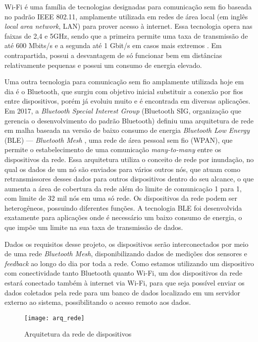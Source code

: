 \documentclass[monografia.tex]{subfiles}
\begin{document}
Wi-Fi é uma família de tecnologias designadas para comunicação sem fio baseada no padrão IEEE 802.11, amplamente utilizada em redes de área local (em inglês \textit{local area network}, LAN) para prover acesso à internet. Essa tecnologia opera nas faixas de 2,4 e 5GHz, sendo que a primeira permite uma taxa de transmissão de até 600 Mbits/s e a segunda até 1 Gbit/s em casos mais extremos \cite{Wi-Fi-datarate}. Em contrapartida, possui a desvantagem de só funcionar bem em distâncias relativamente pequenas e possui um consumo de energia elevado.

Uma outra tecnologia para comunicação sem fio amplamente utilizada hoje em dia é o Bluetooth, que surgiu com objetivo inicial substituir a conexão por fios entre dispositivos, porém já evoluiu muito e é encontrada em diversas aplicações. Em 2017, a \textit{Bluetooth Special Interest Group} (Bluetooth SIG, organização que gerencia o desenvolvimento do padrão Bluetooth) definiu uma arquitetura de rede em malha baseada na versão de baixo consumo de energia \textit{Bluetooth Low Energy} (BLE) --- \textit{Bluetooth Mesh} \cite{BLE-mesh}, uma rede de área pessoal sem fio (WPAN), que permite o estabelecimento de uma comunicação \textit{many-to-many} entre os dispositivos da rede. Essa arquitetura utiliza o conceito de rede por inundação, no qual os dados de um nó são enviados para vários outros nós, que atuam como retransmissores desses dados para outros dispositivos dentro do seu alcance, o que aumenta a área de cobertura da rede além do limite de comunicação 1 para 1, com limite de 32 mil nós em uma só rede. Os dispositivos da rede podem ser heterogêneos, possuindo diferentes funções. A tecnologia BLE foi desenvolvida exatamente para aplicações onde é necessário um baixo consumo de energia, o que impõe um limite na sua taxa de transmissão de dados.

Dados os requisitos desse projeto, os dispositivos serão interconectados por meio de uma rede \textit{Bluetooth Mesh}, disponibilizando dados de medições dos sensores e \textit{feedback} ao longo do dia por toda a rede. Como estamos utilizando um dispositivo com conectividade tanto Bluetooth quanto Wi-Fi, um dos dispositivos da rede estará conectado também à internet via Wi-Fi, para que seja possível enviar os dados coletados pela rede para um banco de dados localizado em um servidor externo ao sistema, possibilitando o acesso remoto aos dados.

\begin{figure}[h!]
    \texttt{[image: arq\_rede]}
    \caption{Arquitetura da rede de dispositivos}
    \label{fig:Diagrama de Blocos}
\end{figure}
\end{document}
